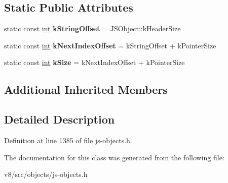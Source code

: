 \subsection*{Static Public Attributes}
\begin{DoxyCompactItemize}
\item 
\mbox{\label{classv8_1_1internal_1_1JSStringIterator_aa018e4de560a748daf9fd8f94c66fd08}} 
static const \mbox{\hyperlink{classint}{int}} {\bfseries k\+String\+Offset} = J\+S\+Object\+::k\+Header\+Size
\item 
\mbox{\label{classv8_1_1internal_1_1JSStringIterator_ae44dac81b066df06c756c7153a170b14}} 
static const \mbox{\hyperlink{classint}{int}} {\bfseries k\+Next\+Index\+Offset} = k\+String\+Offset + k\+Pointer\+Size
\item 
\mbox{\label{classv8_1_1internal_1_1JSStringIterator_aef6356183e1def111fded51434242720}} 
static const \mbox{\hyperlink{classint}{int}} {\bfseries k\+Size} = k\+Next\+Index\+Offset + k\+Pointer\+Size
\end{DoxyCompactItemize}
\subsection*{Additional Inherited Members}


\subsection{Detailed Description}


Definition at line 1385 of file js-\/objects.\+h.



The documentation for this class was generated from the following file\+:\begin{DoxyCompactItemize}
\item 
v8/src/objects/js-\/objects.\+h\end{DoxyCompactItemize}

